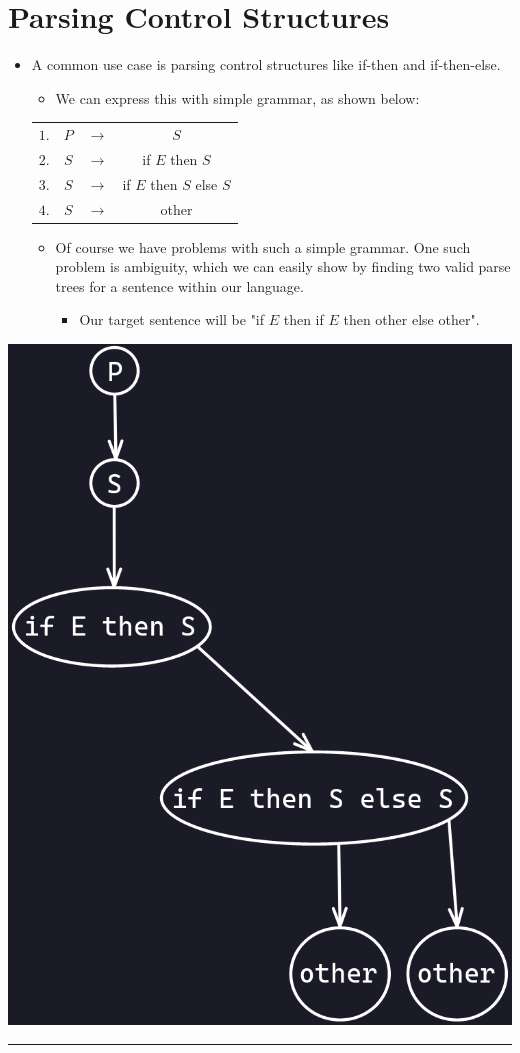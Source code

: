 \documentclass{article}
\begin{document}
\section{Parsing Control Structures}
\begin{itemize}
	\item A common use case is parsing control structures like if-then and if-then-else.
	\begin{itemize}
		\item We can express this with simple grammar, as shown below:
	\end{itemize}
	\begin{center}
		\begin{tabular}{ |c c c c| }
			\hline
			$1.$ & $P$ & ${\rightarrow}$ & $S$ \\
			$2.$ & $S$ & ${\rightarrow}$ & if $E$ then $S$ \\
			$3.$ & $S$ & ${\rightarrow}$ & if $E$ then $S$ else $S$ \\
			$4.$ & $S$ & ${\rightarrow}$ & other \\
			\hline
		\end{tabular}
	\end{center}
	\begin{itemize}
		\item Of course we have problems with such a simple grammar. One such problem is ambiguity, which we can easily show by finding two valid parse trees for a sentence within our language.
		\begin{itemize}
			\item Our target sentence will be "if $E$ then if $E$ then other else other".\
		\end{itemize}
	\end{itemize}
\end{itemize}
\begin{center}
	\includegraphics[scale=0.35]{image4.png}
\end{center}

\hrule
\end{document}

